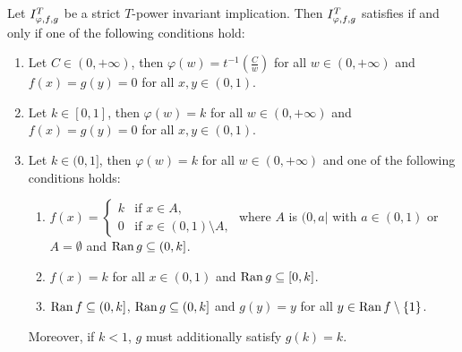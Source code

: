 \begin{proposition}\label{prop:strict:(EP)} Let $I^T_{\varphi,f,g}$ be a strict $T$-power invariant implication. Then  $I^T_{\varphi,f,g}$ satisfies \EP if and only if one of the following conditions hold:
	\begin{enumerate}[label=(\roman*)]
		\item Let $C \in (0,+\infty)$, then $\varphi(w)=t^{-1}\left( \frac{C}{w} \right)$ for all $w \in(0,+\infty)$ and $f(x)=g(y)=0$ for all $x,y \in (0,1)$.
		\item Let $k \in [0,1]$, then $\varphi(w)=k$ for all $w \in (0,+\infty)$ and $f(x)=g(y)=0$ for all $x,y \in (0,1)$.
		\item Let $k \in (0,1]$, then $\varphi(w)=k$ for all $w\in (0,+\infty)$ and one of the following conditions holds:
		\begin{enumerate}
			\item $f(x)=\left\{ \begin{array}{ll}
				k &   \text{if }   x \in A, \\
				0 &  \text{if }   x \in (0,1)\setminus A,	\end{array}
			\right.$ where $A$ is $(0,a|$ with $ a \in (0,1)$ or $A=\emptyset$ and $\operatorname{Ran} g \subseteq (0,k]$.
			\item $f(x)=k$ for all $x\in(0,1)$ and $\operatorname{Ran} g \subseteq [0,k]$.
			\item $\operatorname{Ran} f \subseteq (0,k]$, $\operatorname{Ran} g \subseteq (0,k]$ and $g(y)=y$ for all $y \in \operatorname{Ran} f \setminus \{1\}$.
		\end{enumerate}
		Moreover, if $k < 1$, $g$ must additionally satisfy $g(k)=k$.
	\end{enumerate}
\end{proposition}
